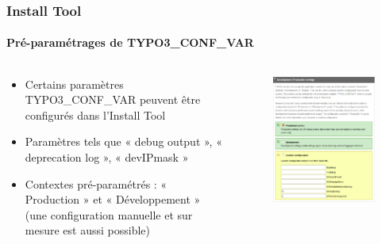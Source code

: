 \begin{frame}[fragile]
	\frametitle{Install Tool}
	\framesubtitle{Pré-paramétrages de TYPO3\_CONF\_VAR}

	\begin{columns}[T]
		\begin{column}{.5\textwidth}

			\begin{itemize}
				\item Certains paramètres TYPO3\_CONF\_VAR peuvent être configurés dans l'Install Tool
				\item Paramètres tels que « debug output », « deprecation log », « devIPmask »
				\item Contextes pré-paramétrés : « Production » et « Développement » (une configuration manuelle et sur mesure est aussi possible)
			\end{itemize}

		\end{column}
		\begin{column}{.5\textwidth}

			\begin{figure}\vspace*{-0.4cm}
				\includegraphics[width=0.8\linewidth]{Images/InstallTool/ApplicationContext.png}
			\end{figure}

		\end{column}
	\end{columns}

\end{frame}

